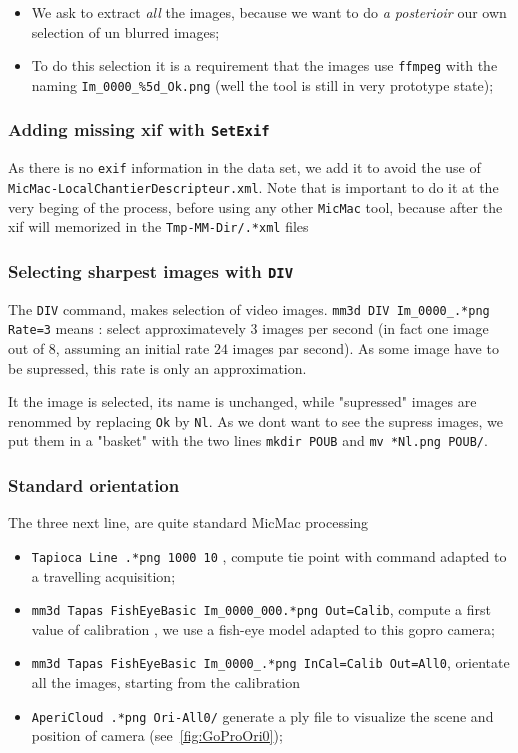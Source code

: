 \begin{itemize}
   \item We ask to extract \emph{all} the images, because we want to do  \emph{a posterioir} our own selection 
         of un blurred images;
   \item To do this selection it is  a requirement that the images use {\tt ffmpeg}  with the naming
          {\tt Im\_0000\_\%5d\_Ok.png}  (well the tool is still in very prototype state);

\end{itemize}


\subsubsection{Adding missing xif with {\tt SetExif}}

As there is no {\tt exif} information in the data set, we  add it to avoid the use of {\tt MicMac-LocalChantierDescripteur.xml}.
Note that is important to do it at the very beging of the process, before using any other {\tt MicMac} tool, because after the xif 
will memorized in the {\tt Tmp-MM-Dir/.*xml} files


\subsubsection{Selecting sharpest images with  {\tt DIV}}

The {\tt DIV} command, makes selection of video images.
{\tt mm3d DIV Im\_0000\_.*png Rate=3} means : select approximatevely $3$ images per second 
(in fact one image out of $8$, assuming an initial rate $24$ images par second).  As  some image have to be supressed,
this rate is only an approximation.

It the image is selected, its name is unchanged, while "supressed" images are renommed by replacing {\tt Ok} by {\tt Nl}.
As we dont want to see the supress images, we put them in a "basket" with the two lines 
{\tt mkdir POUB} and {\tt mv *Nl.png POUB/}.


\subsubsection{Standard orientation}

The three next line, are quite standard MicMac processing

\begin{itemize}
    \item {\tt  Tapioca Line .*png 1000 10} , compute tie point with command adapted to a travelling acquisition;
    \item {\tt  mm3d Tapas  FishEyeBasic Im\_0000\_000.*png Out=Calib}, compute a first value of calibration , we
         use a fish-eye model adapted to this gopro camera;
    \item {\tt  mm3d Tapas  FishEyeBasic Im\_0000\_.*png InCal=Calib Out=All0}, orientate all the images, starting from
         the calibration
    \item {\tt  AperiCloud  .*png Ori-All0/} generate a ply file to visualize the scene and position of camera (see~\ref{fig:GoProOri0});

\end{itemize}

